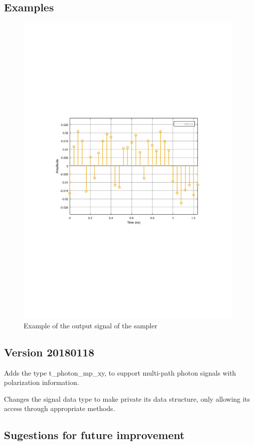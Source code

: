 \subsection*{Examples}

\begin{figure}[h]
	\centering
	\includegraphics[clip, trim=0.5cm 9cm 0.5cm 9cm, width=\textwidth]{./lib/sampler/figures/MQAM_sampler_output.pdf}
	\caption{Example of the output signal of the sampler}\label{Sampler_output}
\end{figure}

\subsection{ Version 20180118}

Adds the type t\_photon\_mp\_xy, to support multi-path photon signals with polarization information.

Changes the signal data type to make private its data structure, only allowing its access through appropriate methods.


\subsection*{Sugestions for future improvement}
